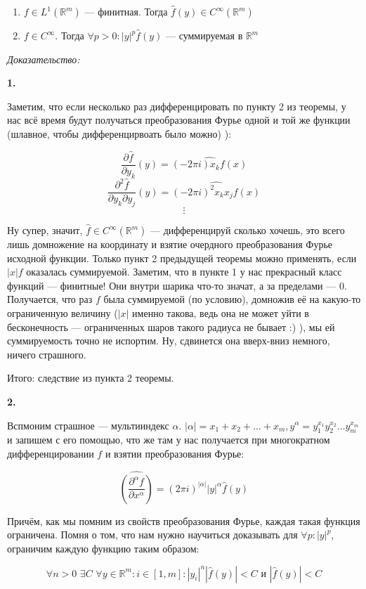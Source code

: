 \documentclass{article}
\def\dbl{\,\,}
\begin{document}
\begin{enumerate}
    \item $f \in L^1(\mathbb{R}^m)$ --- финитная. Тогда $\hat{f}(y) \in C^{\infty}(\mathbb{R}^m)$
    \item $f \in C^{\infty}$. Тогда $\forall p > 0: |y|^p \hat{f}(y)$ --- суммируемая в $\mathbb{R}^m$
\end{enumerate}

\textit{Доказательство:}

\textbf{1.}

Заметим, что если несколько раз дифференцировать по пункту 2 из теоремы, у нас всё время будут получаться преобразования Фурье одной и той же функции (шлавное, чтобы дифференцирвоать было можно) ):

\[\frac{\partial \hat{f}}{\partial y_k}(y) = \widehat{(-2\pi i)x_kf(x)}\]
\[\frac{\partial^2 \hat{f}}{\partial y_k \partial y_j}(y) = \widehat{(-2\pi i)^2x_kx_jf(x)}\]
\[\vdots\]

Ну супер, значит, $\hat{f} \in C^{\infty}(\mathbb{R}^m)$ --- дифференцируй сколько хочешь, это всего лишь домножение на координату и взятие очердного преобразования Фурье исходной функции. Только пункт 2 предыдущей теоремы можно применять, если $|x| f$ оказалась суммируемой. Заметим, что в пункте 1 у нас прекрасный класс функций --- финитные! Они внутри шарика что-то значат, а за пределами --- 0. Получается, что раз $f$ была суммируемой (по условию), домножив её на какую-то ограниченную величину ($|x|$ именно такова, ведь она не может уйти в бесконечность --- ограниченных шаров такого радиуса не бывает :) ), мы ей суммируемость точно не испортим. Ну, сдвинется она вверх-вниз немного, ничего страшного.

Итого: следствие из пункта 2 теоремы.

\textbf{2.}

Вспмоним страшное --- мультииндекс $\alpha$. $|\alpha| = x_1 + x_2 + \ldots + x_m, y^\alpha = y_1^{x_1}y_2^{x_2}\ldots y_m^{x_m}$ и запишем с его помощью, что же там у нас получается при многократном дифференцировании $f$ и взятии преобразования Фурье:

\[\widehat{\left(\frac{\partial^\alpha f}{\partial x^\alpha}\right)} = (2\pi i)^{|\alpha|} |y|^{\alpha} \hat{f}(y)\]

Причём, как мы помним из свойств преобразования Фурье, каждая такая функция ограничена. Помня о том, что нам нужно научиться доказывать для $\forall p : |y|^p$, ограничим каждую функцию таким образом:

\[\forall n > 0 \dbl \exists C \dbl \forall y \in \mathbb{R}^m: i \in [1, m]: |y_i|^n|\hat{f}(y)| < C \text{ и } |\hat{f}(y)| < C\]
\end{document}
